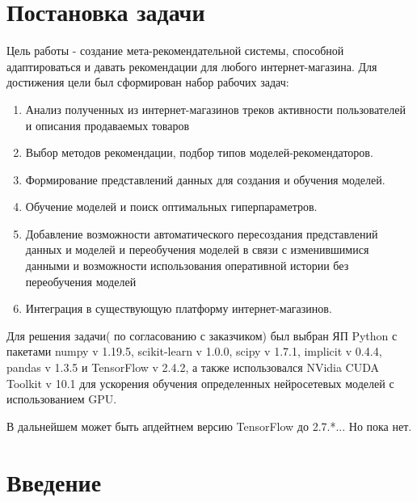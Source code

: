 \documentclass[14pt]{mmcs_article}
\begin{document}

\renewcommand{\contentsname}{Оглавление}

\tableofcontents

\newpage
{}

\section*{Постановка задачи}


Цель работы - создание мета-рекомендательной системы, способной адаптироваться и давать рекомендации для любого интернет-магазина. Для достижения цели был сформирован набор рабочих задач:
\begin{enumerate}
	\item Анализ полученных из интернет-магазинов треков активности пользователей и описания продаваемых товаров
	\item Выбор методов рекомендации, подбор типов моделей-рекомендаторов.
	\item Формирование представлений данных для создания и обучения моделей.
	\item Обучение моделей и поиск оптимальных гиперпараметров.
	\item Добавление возможности автоматического пересоздания представлений данных и моделей и переобучения моделей в связи с изменившимися данными и возможности использования оперативной истории без переобучения моделей
	\item Интеграция в существующую платформу интернет-магазинов.
\end{enumerate}

Для решения задачи( по согласованию с заказчиком) был выбран ЯП Python с пакетами numpy v 1.19.5, scikit-learn v 1.0.0, scipy v 1.7.1, implicit v 0.4.4, pandas v 1.3.5 и TensorFlow v 2.4.2, а также использовался NVidia CUDA Toolkit v 10.1 для ускорения обучения определенных нейросетевых моделей с использованием GPU.

В дальнейшем может быть апдейтнем версию TensorFlow до 2.7.*... Но пока нет. 


\newpage
{}
\section*{Введение}
\end{document}
